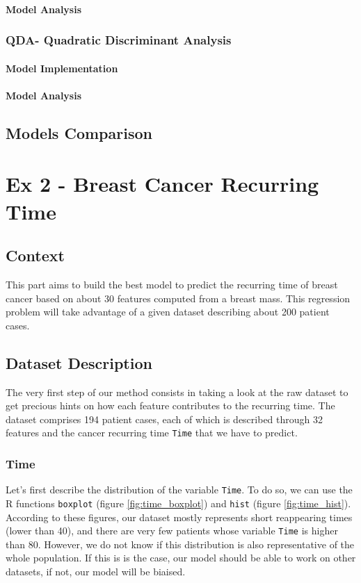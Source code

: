 \documentclass[]{report}
\begin{document}
\subsubsection{Model Analysis}


\subsection{QDA- Quadratic Discriminant Analysis}
\subsubsection{Model Implementation}
\subsubsection{Model Analysis}


\section{Models Comparison}




\chapter{Ex 2 - Breast Cancer Recurring Time}

\section{Context}
This part aims to build the best model to predict the recurring time of breast cancer based on about 30 features computed from a breast mass.  This regression problem will take advantage of a given dataset describing about 200 patient cases.

\section{Dataset Description}
The very first step of our method consists in taking a look at the raw dataset to get precious hints on how each feature contributes to the recurring time. The dataset comprises 194 patient cases, each of which is described through 32 features and the cancer recurring time \texttt{Time} that we have to predict.

\subsection{Time}
Let's first describe the distribution of the variable \texttt{Time}. To do so, we can use the R functions \texttt{boxplot} (figure \ref{fig:time_boxplot}) and \texttt{hist} (figure \ref{fig:time_hist}). According to these figures, our dataset mostly represents short reappearing times (lower than 40), and there are very few patients whose variable \texttt{Time} is higher than 80. However, we do not know if this distribution is also representative of the whole population. If this is is the case, our model should be able to work on other datasets, if not, our model will be biaised.
\end{document}
